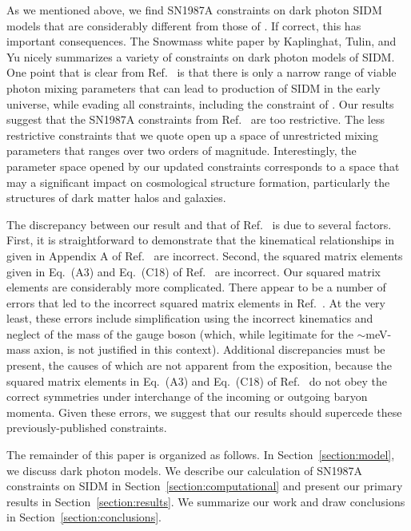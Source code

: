\documentclass[nofootinbib,prd,superscriptaddress,twocolumn]{revtex4}
\begin{document}
As we mentioned above, we find SN1987A constraints on dark photon SIDM models that are considerably different 
from those of \cite{dent_etal12}. If correct, this has important consequences. The Snowmass white paper by Kaplinghat, 
Tulin, and Yu \cite{kaplinghat_etal13_whitepaper} nicely summarizes a variety of constraints on dark photon models of 
SIDM. One point that is clear from Ref.~\cite{kaplinghat_etal13_whitepaper} is that there is only a narrow range of 
viable photon mixing parameters that can lead to production of SIDM in the early universe, while evading all constraints, 
including the constraint of \cite{dent_etal12}. Our results suggest that the SN1987A constraints from Ref.~\cite{dent_etal12} 
are too restrictive. The less restrictive constraints that we quote open up a space of unrestricted mixing parameters that 
ranges over two orders of magnitude. Interestingly, the parameter space opened by our updated constraints corresponds to a 
space that may a significant impact on cosmological structure formation, particularly the structures of dark matter halos and galaxies. 


The discrepancy between our result and that of Ref.~\cite{dent_etal12} is due to several factors. First, it is straightforward to 
demonstrate that the kinematical relationships in given in Appendix A of Ref.~\cite{dent_etal12} are incorrect. Second, the 
squared matrix elements given in Eq.~(A3) and Eq.~(C18) of Ref.~\cite{dent_etal12} are incorrect. Our squared matrix elements 
are considerably more complicated. There appear to be a number of errors that led to the incorrect squared matrix elements in 
Ref.~\cite{dent_etal12}. At the very least, these errors include simplification using the incorrect kinematics and neglect of the 
mass of the gauge boson (which, while legitimate for the $\sim$meV-mass axion, is not justified in this context). Additional 
discrepancies must be present, the causes of which are not apparent from the exposition, 
because the squared matrix elements in Eq.~(A3) and Eq.~(C18) of Ref.~\cite{dent_etal12} 
do not obey the correct symmetries under interchange of the incoming or outgoing baryon momenta. 
Given these errors, we suggest that our results should supercede these previously-published constraints.

The remainder of this paper is organized as follows. In Section~\ref{section:model}, we discuss 
dark photon models. We describe our calculation of SN1987A constraints on SIDM in 
Section~\ref{section:computational} and present our primary results in Section~\ref{section:results}. 
We summarize our work and draw conclusions in Section~\ref{section:conclusions}. 
\end{document}
